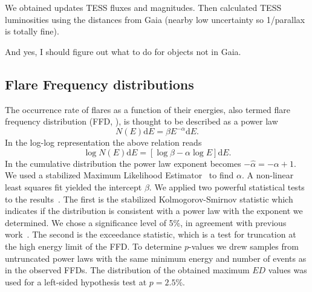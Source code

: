 \documentclass{aastex62}
\begin{document}
We obtained updates TESS fluxes and magnitudes. Then calculated TESS luminosities using the distances from Gaia (nearby low uncertainty so 1/parallax is totally fine). 

And yes, I should figure out what to do for objects not in Gaia. 

\subsection{Flare Frequency distributions} \label{subsec:FFD}
The occurrence rate of flares as a function of their energies, also termed flare frequency distribution (FFD, \cite{lacy1976}), is thought to be described as a power law
\begin{equation}
N(E)\mathrm{d}E = \beta E^{-\alpha}\mathrm{d}E.
\end{equation}
In the log-log representation the above relation reads
\begin{equation}
\log N(E) \mathrm{d}E = [\log\beta -\alpha\log E] \mathrm{d}E.
\end{equation}
In the cumulative distribution the power law exponent becomes $-\hat{\alpha} = -\alpha +1$. 
We used a stabilized Maximum Likelihood Estimator~\citep{maschberger2009} to find $\alpha$. A non-linear least squares fit yielded the intercept $\beta$. We applied two powerful statistical tests to the results~\citep{maschberger2009}. The first is the stabilized Kolmogorov-Smirnov statistic which indicates if the distribution is consistent with a power law with the exponent we determined. We chose a significance level of 5\%, in agreement with previous work~\citep{loyd2018}. The second is the exceedance statistic, which is a test for truncation at the high energy limit of the FFD. To determine $p$-values we drew samples from untruncated power laws with the same minimum energy and number of events as in the observed FFDs. The distribution of the obtained maximum $ED$ values was used for a left-sided hypothesis test at $p=2.5\%$. 
 
%
%
\end{document}
